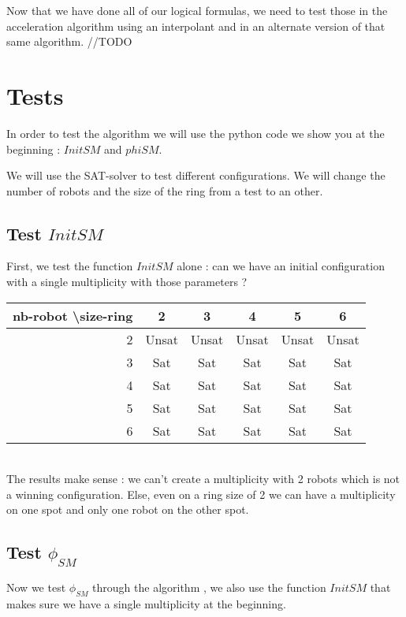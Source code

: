 \documentclass{article}
\begin{document}
Now that we have done all of our logical formulas, we need to test those in the acceleration algorithm using an interpolant \cite{algo} and in an alternate version of that same algorithm.
//TODO
\section{Tests}

In order to test the algorithm \cite{algo} we will use the python code we show you at the beginning : $InitSM$ and $phiSM$.

We will use the SAT-solver to test different configurations. We will change the number of robots and the size of the ring from a test to an other.

\subsection{Test $InitSM$}

First, we test the function $InitSM$ alone : can we have an initial configuration with a single multiplicity with those parameters ?\\

\begin{tabular}{|r|c|c|c|c|c|}
  \hline
  nb-robot \textbackslash size-ring & 2 & 3 & 4 & 5 & 6\\
  \hline
  2 & Unsat & Unsat & Unsat & Unsat & Unsat \\
  \hline
  3 & Sat & Sat & Sat & Sat & Sat \\
  \hline
  4 & Sat & Sat & Sat & Sat & Sat \\
  \hline
  5 & Sat & Sat & Sat & Sat & Sat \\
  \hline
  6 & Sat & Sat & Sat & Sat & Sat \\
  \hline
\end{tabular}
\\

The results make sense : we can't create a multiplicity with 2 robots which is not a winning configuration. Else, even on a ring size of 2 we can have a multiplicity on one spot and only one robot on the other spot.

\subsection{Test $\phi_{SM}$}

Now we test $\phi_{SM}$ through the algorithm \cite{algo}, we also use the function $InitSM$ that makes sure we have a single multiplicity at the beginning.\\
\end{document}
